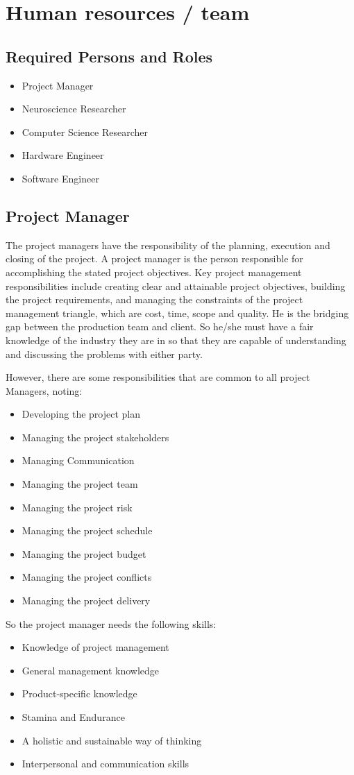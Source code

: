 \section{Human resources / team}
\label{sect:team}
\subsection{Required Persons and Roles}
\begin{itemize}
\item Project Manager
\item Neuroscience Researcher
\item Computer Science Researcher
\item Hardware Engineer
\item Software Engineer
\end{itemize}

\subsection{Project Manager}
The project managers have the responsibility of the planning, execution and closing of the project. A project manager is the person responsible for accomplishing the stated project objectives. Key project management responsibilities include creating clear and attainable project objectives, building the project requirements, and managing the constraints of the project management triangle, which are cost, time, scope and quality. He is the bridging gap between the production team and client. So he/she must have a fair knowledge of the industry they are in so that they are capable of understanding and discussing the problems with either party.

However, there are some responsibilities that are common to all project Managers, noting:
\begin{itemize}
\item Developing the project plan
\item Managing the project stakeholders
\item Managing Communication
\item Managing the project team
\item Managing the project risk
\item Managing the project schedule
\item Managing the project budget
\item Managing the project conflicts
\item Managing the project delivery
\end{itemize}
So the project manager needs the following skills:
\begin{itemize}
\item Knowledge of project management
\item General management knowledge
\item Product-specific knowledge
\item Stamina and Endurance
\item A holistic and sustainable way of thinking
\item Interpersonal and communication skills
\end{itemize}

